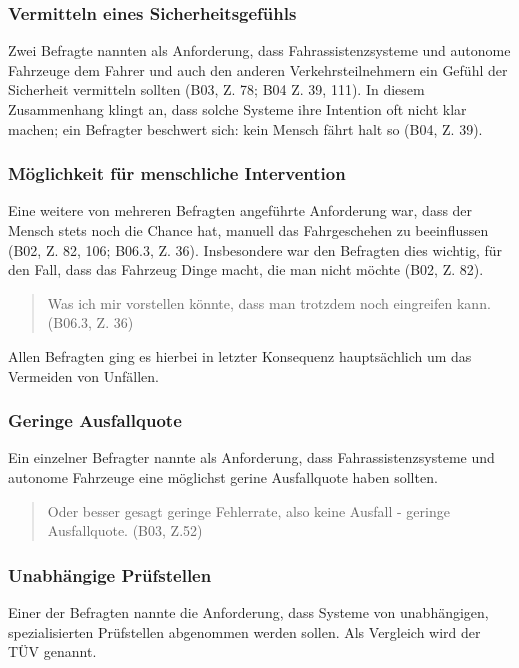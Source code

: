 \documentclass[12pt]{article}
\begin{document}
\subsubsection*{Vermitteln eines Sicherheitsgefühls}
 Zwei Befragte nannten als Anforderung, dass Fahrassistenzsysteme und autonome Fahrzeuge dem Fahrer und auch den anderen Verkehrsteilnehmern ein Gefühl der Sicherheit vermitteln sollten (B03, Z. 78; B04 Z. 39, 111). In diesem Zusammenhang klingt an, dass solche Systeme ihre Intention oft nicht klar machen; ein Befragter beschwert sich: \glqq kein Mensch fährt halt so\grqq{} (B04, Z. 39).

\subsubsection*{Möglichkeit für menschliche Intervention}
Eine weitere von mehreren Befragten angeführte Anforderung war, dass der Mensch stets noch die Chance hat, manuell das Fahrgeschehen zu beeinflussen (B02, Z. 82, 106; B06.3, Z. 36). Insbesondere war den Befragten dies wichtig, für den Fall, dass \glqq das Fahrzeug Dinge macht, die man nicht möchte\grqq{} (B02, Z. 82).

\begin{quote}
  Was ich mir vorstellen könnte, dass man trotzdem noch eingreifen kann. (B06.3, Z. 36)
\end{quote}

Allen Befragten ging es hierbei in letzter Konsequenz hauptsächlich um das Vermeiden von Unfällen.

\subsubsection*{Geringe Ausfallquote}
Ein einzelner Befragter nannte als Anforderung, dass Fahrassistenzsysteme und autonome Fahrzeuge eine möglichst gerine Ausfallquote haben sollten.

\begin{quote}
  Oder besser gesagt geringe Fehlerrate, also keine Ausfall - geringe Ausfallquote. (B03, Z.52)
\end{quote}

\subsubsection*{Unabhängige Prüfstellen}
Einer der Befragten nannte die Anforderung, dass Systeme von unabhängigen, spezialisierten Prüfstellen abgenommen werden sollen. Als Vergleich wird der TÜV genannt.
\end{document}
